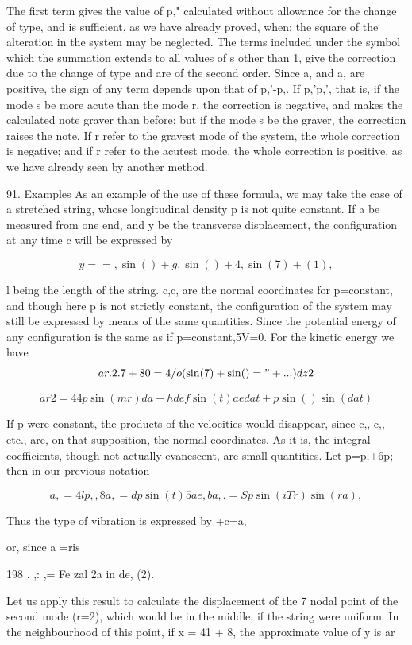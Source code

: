 The first term gives the value of p," calculated without allowance for the
change of type, and is sufficient, as we have already proved, when: the square
of the alteration in the system may be neglected. The terms included under the
symbol which the summation extends to all values of s other than 1, give the
correction due to the change of type and are of the second order. Since a, and
a, are positive, the sign of any term depends upon that of p,'-p,. If p,'p,',
that is, if the mode s be more acute than the mode r, the correction is
negative, and makes the calculated note graver than before; but if the mode s
be the graver, the correction raises the note. If r refer to the gravest mode
of the system, the whole correction is negative; and if r refer to the acutest
mode, the whole correction is positive, as we have already seen by another
method.

91.  Examples As an example of the use of these formula, we may take the case of a
stretched string, whose longitudinal density p is not quite constant. If a be
measured from one end, and y be the transverse displacement, the configuration
at any time c will be expressed by

\[y= = , \sin()+ g, \sin()+ 4, \sin(7) + (1),\]

l being the length of the string. c,c, are the normal coordinates for
p=constant, and though here p is not strictly constant, the configuration of
the system may still be expressed by means of the same quantities. Since the
potential energy of any configuration is the same as if p=constant,5V=0. For
the kinetic energy we have
\[ar . 2 .  7+80=4/ o( \sin(7)+ \sin()=" +...) dz 2\]

\[ar 2 =44 p \sin(mr) da + h de f \sin(t)ae dat + p \sin() \sin(dat)\]

If p were constant, the products of the velocities would disappear, since c,,
c,, etc., are, on that supposition, the normal coordinates. As it is, the
integral coefficients, though not actually evanescent, are small quantities.
Let p=p,+6p; then in our previous notation

\[a,=4lp,, 8a, =   dp \sin(t)5 ae, ba,.=   Sp \sin(i Tr) \sin(ra),\]

Thus the type of vibration is expressed by +c=a,

or, since a =ris

198 . ,: ,= Fe zal 2a in de, (2).

Let us apply this result to calculate the displacement of the 7 nodal point of
the second mode (r=2), which would be in the middle, if the string were
uniform. In the neighbourhood of this point, if x = 41 + 8, the approximate
value of y is ar

